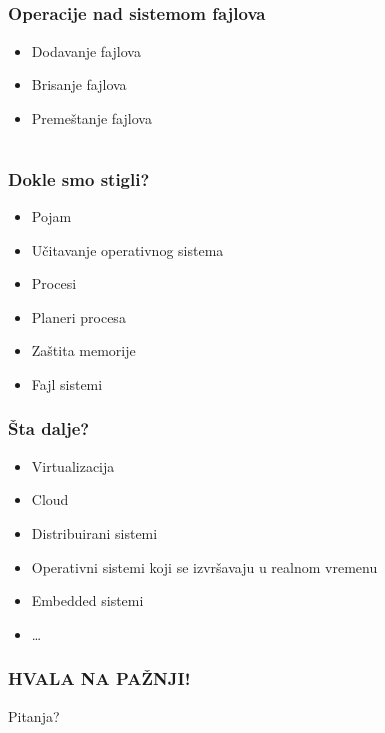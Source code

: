 \documentclass{beamer}
\begin{document}
\subsection*{}

\begin{frame}
    \frametitle{Operacije nad sistemom fajlova}
    \begin{itemize}
        \item Dodavanje fajlova \newline
        \item Brisanje fajlova \newline
        \item Premeštanje fajlova
    \end{itemize}
\end{frame}

\subsection*{}
\section*{}

\begin{frame}
    \frametitle{Dokle smo stigli?}
    \begin{itemize}
        \item Pojam \newline
        \item Učitavanje operativnog sistema \newline
        \item Procesi \newline
        \item Planeri procesa \newline
        \item Zaštita memorije \newline
        \item Fajl sistemi
    \end{itemize}
\end{frame}

\begin{frame}
    \frametitle{Šta dalje?}
    \begin{itemize}
        \item Virtualizacija \newline
        \item Cloud \newline
        \item Distribuirani sistemi \newline
        \item Operativni sistemi koji se izvršavaju u realnom vremenu \newline
        \item Embedded sistemi \newline
        \item \dots
    \end{itemize}
\end{frame}

\begin{frame}
    \frametitle{HVALA NA PAŽNJI!}
    \begin{center}
        \Huge Pitanja?    
    \end{center}
\end{frame}
\end{document}
